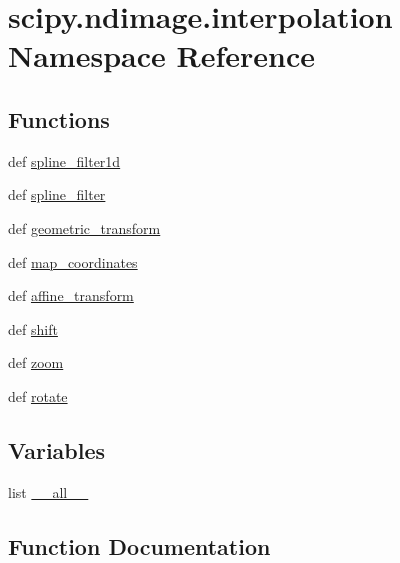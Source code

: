 \hypertarget{namespacescipy_1_1ndimage_1_1interpolation}{}\section{scipy.\+ndimage.\+interpolation Namespace Reference}
\label{namespacescipy_1_1ndimage_1_1interpolation}
\subsection*{Functions}
\begin{DoxyCompactItemize}
\item 
def \hyperlink{namespacescipy_1_1ndimage_1_1interpolation_a25d17b60f8116bf93653f23a4cd0b77b}{spline\+\_\+filter1d}
\item 
def \hyperlink{namespacescipy_1_1ndimage_1_1interpolation_a76cbec8c11b62a35fa225fb6fc4d786d}{spline\+\_\+filter}
\item 
def \hyperlink{namespacescipy_1_1ndimage_1_1interpolation_af937dbd95ebfb4145ff0a97af27ef985}{geometric\+\_\+transform}
\item 
def \hyperlink{namespacescipy_1_1ndimage_1_1interpolation_acc7e6b8904f3c4e9df3a4aa135f77e10}{map\+\_\+coordinates}
\item 
def \hyperlink{namespacescipy_1_1ndimage_1_1interpolation_a2dd803c1031673376f9e69739b0fe208}{affine\+\_\+transform}
\item 
def \hyperlink{namespacescipy_1_1ndimage_1_1interpolation_a0b897ab9708c006d9e1c696dfd61d46f}{shift}
\item 
def \hyperlink{namespacescipy_1_1ndimage_1_1interpolation_a03ec10a1d2993d79751b35f664247467}{zoom}
\item 
def \hyperlink{namespacescipy_1_1ndimage_1_1interpolation_abb9f8f94c0fd801436c15c06c65c2a81}{rotate}
\end{DoxyCompactItemize}
\subsection*{Variables}
\begin{DoxyCompactItemize}
\item 
list \hyperlink{namespacescipy_1_1ndimage_1_1interpolation_acecf910ae21d689b5db25e9832428764}{\+\_\+\+\_\+all\+\_\+\+\_\+}
\end{DoxyCompactItemize}


\subsection{Function Documentation}
\hypertarget{namespacescipy_1_1ndimage_1_1interpolation_a2dd803c1031673376f9e69739b0fe208}{}
